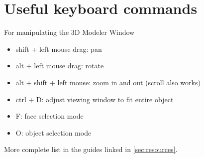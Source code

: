 \documentclass[11pt]{article}
\begin{document}

\section{Useful keyboard commands}

For manipulating the 3D Modeler Window
\begin{itemize}
	\itemsep-0.2em

	\item shift + left mouse drag: pan
	\item alt + left mouse drag: rotate
	\item alt + shift + left mouse: zoom in and out (scroll also works)
	\item ctrl + D: adjust viewing window to fit entire object
	\item F: face selection mode
	\item O: object selection mode 

\end{itemize}

More complete list in the guides linked in \ref{sec:resources}.
\end{document}
